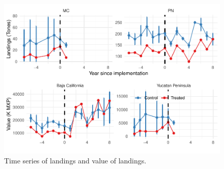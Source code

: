 \documentclass[utf8]{frontiers_suppmat} %
\begin{document}
\begin{figure}
\centering
\includegraphics{SupplementaryMaterial_files/figure-latex/unnamed-chunk-9-1.pdf}
\caption{\label{fig:unnamed-chunk-9}Time series of landings and value of landings.}
\end{figure}

\clearpage
\end{document}
